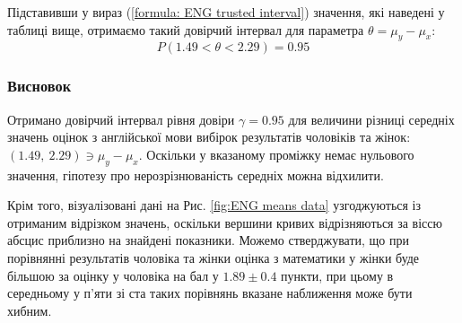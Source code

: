 Підставивши у вираз (\ref{formula: ENG trusted interval}) значення, які наведені у таблиці вище, отримаємо такий довірчий 
інтервал для параметра $\theta=\mu_y-\mu_x$:
\begin{equation*}
    P(1.49 < \theta < 2.29)=0.95
\end{equation*}

\subsubsection*{Висновок}

Отримано довірчий інтервал рівня довіри $\gamma=0.95$ для величини різниці середніх значень 
оцінок з англійської мови вибірок результатів чоловіків та жінок: $(1.49,\ 2.29)\ni \mu_y-\mu_x$. Оскільки 
у вказаному проміжку немає нульового значення, гіпотезу про нерозрізнюваність середніх можна відхилити. 

Крім того, візуалізовані дані на Рис. \ref{fig:ENG means data} узгоджуються із отриманим відрізком значень, 
оскільки вершини кривих відрізняються за віссю абсцис приблизно на знай\-дені показники. Можемо стверджувати, 
що при порівнянні результатів чоловіка та жінки оцінка з математики у жінки буде більшою за оцінку у 
чоловіка на бал у $1.89\pm 0.4$ пункти, при цьому в середньому у п'яти зі ста таких порівнянь вказане 
наближення може бути хибним.
